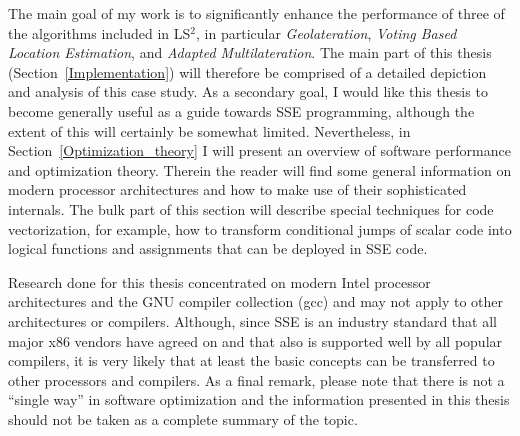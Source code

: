 The main goal of my work is to significantly enhance the performance of three of the algorithms included in LS$^{2}$, in particular \emph{Geolateration}, \emph{Voting Based Location Estimation}, and \emph{Adapted Multilateration}. The main part of this thesis (Section~\ref{Implementation}) will therefore be comprised of a detailed depiction and analysis of this case study. As a secondary goal, I would like this thesis to become generally useful as a guide towards SSE programming, although the extent of this will certainly be somewhat limited. Nevertheless, in Section~\ref{Optimization_theory} I will present an overview of software performance and optimization theory. Therein the reader will find some general information on modern processor architectures and how to make use of their sophisticated internals. The bulk part of this section will describe special techniques for code vectorization, for example, how to transform conditional jumps of scalar code into logical functions and assignments that can be deployed in SSE code.

Research done for this thesis concentrated on modern Intel processor architectures and the GNU compiler collection (gcc) and may not apply to other architectures or compilers. Although, since SSE is an industry standard that all major x86 vendors have agreed on and that also is supported well by all popular compilers, it is very likely that at least the basic concepts can be transferred to other processors and compilers. As a final remark, please note that there is not a ``single way'' in software optimization and the information presented in this thesis should not be taken as a complete summary of the topic.

